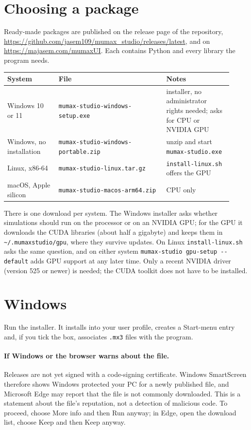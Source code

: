 \documentclass[11pt,a4paper,oneside]{book}
\newcommand{\code}[1]{\texttt{#1}}
\renewcommand{\_}{\textunderscore\allowbreak}
\newcommand{\menu}[1]{\textsf{#1}}
\begin{document}
\section{Choosing a package}

Ready-made packages are published on the release page of the repository,
\url{https://github.com/jasem109/mumax_studio/releases/latest}, and on \url{https://majasem.com/mumaxUI}. Each
contains Python and every library the program needs.

\begin{center}
\small
\begin{tabular}{>{\raggedright}p{0.21\linewidth}>{\raggedright}p{0.44\linewidth}>{\raggedright\arraybackslash}p{0.27\linewidth}}
\toprule
System & File & Notes \\
\midrule
Windows 10 or 11 & \code{mumax-studio-windows-setup.exe} & installer, no administrator rights needed; asks for CPU or NVIDIA GPU \\
Windows, no installation & \code{mumax-studio-windows-portable.zip} & unzip and start \code{mumax-studio.exe} \\
Linux, x86-64 & \code{mumax-studio-linux.tar.gz} & \code{install-linux.sh} offers the GPU \\
macOS, Apple silicon & \code{mumax-studio-macos-arm64.zip} & CPU only \\
\bottomrule
\end{tabular}
\end{center}

There is one download per system. The Windows installer asks whether simulations should run on the processor or
on an NVIDIA GPU; for the GPU it downloads the CUDA libraries (about half a gigabyte) and keeps them in
\code{\textasciitilde/.mumaxstudio/gpu}, where they survive updates. On Linux \code{install-linux.sh} asks the
same question, and on either system \code{mumax-studio gpu-setup -{}-default} adds GPU support at any later
time. Only a recent NVIDIA driver (version 525 or newer) is needed; the CUDA toolkit does not have to be installed.

\section{Windows}

Run the installer. It installs into your user profile, creates a Start-menu entry and, if you tick the box,
associates \code{.mx3} files with the program.

\paragraph{If Windows or the browser warns about the file.} Releases are not yet signed with a code-signing
certificate. Windows SmartScreen therefore shows \menu{Windows protected your PC} for a newly published file, and
Microsoft Edge may report that the file is \menu{not commonly downloaded}. This is a statement about the file's
reputation, not a detection of malicious code. To proceed, choose \menu{More info} and then \menu{Run anyway}; in
Edge, open the download list, choose \menu{Keep} and then \menu{Keep anyway}.
\end{document}
